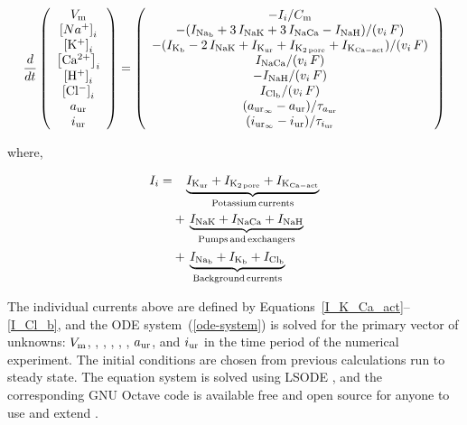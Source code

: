 \begin{equation}
  \frac{d}{dt}
  \left(
    \begin{array}{c}
      V_{\rm m}\\
      \left[Na^{+}\right]_{i}\\
      \left[\rm K^{+}\right]_{i}\\
      \left[\rm Ca^{2+}\right]_{i}\\
      \left[\rm H^{+}\right]_{i}\\
      \left[\rm Cl^{-}\right]_{i}\\
      a_{\rm ur}\\
      i_{\rm ur}\\
    \end{array}
  \right)  = \left(
    \begin{array}{c}
      -I_{i}/{C_{\rm m}}\\
      - (I_{\rm Na_{b}} + 3\, I_{\rm NaK} + 3\, I_{\rm NaCa} - I_{\rm
        NaH})/(v_{i}\, F)\\
      - (I_{\rm K_{b}} - 2\, I_{\rm NaK} + I_{\rm K_{ur}} + I_{\rm
        K_{2\, pore}} + I_{\rm K_{Ca-act}})/(v_{i}\,
      F)\\
        I_{\rm NaCa}/(v_{i}\, F)\\
      - I_{\rm NaH}/(v_{i}\, F)\\
        I_{\rm Cl_{b}}/(v_{i}\, F)\\
      (a_{{\rm ur}_{\infty}} - a_{\rm ur})/\tau_{a_{\rm ur}}\\
      (i_{{\rm ur}_{\infty}} - i_{\rm ur})/\tau_{i_{\rm ur}}\\
    \end{array}
  \right)
  \label{ode-system}
\end{equation}

\noindent where,

\begin{equation*}
    \begin{split}
      I_{i} =
      & \phantom{+\,} \underbrace{I_{\rm K_{ur}} + I_{\rm K_{2\, pore}} + I_{\rm
          K_{Ca-act}}}_{\rm Potassium\, currents}\\
      & +\, \underbrace{I_{\rm NaK} + I_{\rm NaCa} + I_{\rm NaH}}_{\rm
        Pumps\, and\, exchangers}\\
      & +\, \underbrace{I_{\rm Na_b} + I_{\rm K_b} + I_{\rm Cl_b}}_{\rm
        Background\, currents}
    \end{split}
\end{equation*}

The individual currents above are defined by
Equations~\ref{I_K_Ca_act}--\ref{I_Cl_b}, and the ODE
system~(\ref{ode-system}) is solved for the primary vector of
unknowns: $V_{\rm m}$, \Nai, \Ki, \Cai, \Hi, \Cli, $a_{\rm ur}$, and
$i_{\rm ur}$ in the time period of the numerical experiment. The
initial conditions are chosen from previous calculations run to steady
state. The equation system is solved using LSODE
\citep{RadhakrishnanHindmarsh1993}, and the corresponding GNU Octave
code is available free and open source for anyone to use and extend
\citep{UNKNOWN}.

